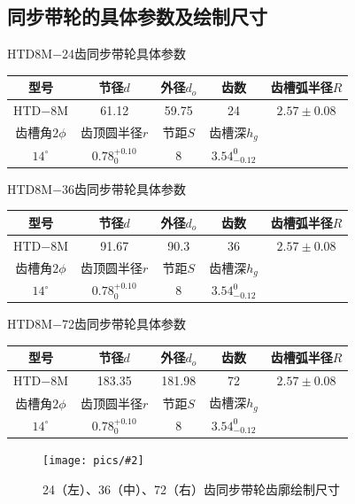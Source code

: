 \documentclass[UTF8]{article}%
\renewcommand{\arraystretch}{1.5}
\newcommand{\p}[4][0.5]{\begin{figure}[h]\centering\texttt{[image: pics/\#2]}\\\caption{#3}\label{#4}\end{figure}}%
\newcommand{\n}{\par}%
\begin{document}
\begin{spacing}{1.5}
	\subsection{同步带轮的具体参数及绘制尺寸}
	\begin{center}
		\renewcommand{\arraystretch}{0.6}
		HTD8M$-$24齿同步带轮具体参数\n
		\vspace*{0.2cm}
		\begin{tabular}{|c|c|c|c|c|}
			\hline 型号&节径$d$&外径$d_o$&齿数&齿槽弧半径$R$\\
			\hline HTD$-$8M&61.12&59.75&24&$2.57\pm0.08$\\
			\hline 齿槽角$2\phi$&齿顶圆半径$r$&节距$S$&齿槽深$h_g$&\\
			\hline $14^{\circ}$&$0.78_0^{+0.10}$&8&$3.54_{-0.12}^{0}$&\\\hline
		\end{tabular}
	\end{center}\n
	\begin{center}
		\renewcommand{\arraystretch}{0.6}
		HTD8M$-$36齿同步带轮具体参数\n
		\vspace*{0.2cm}
		\begin{tabular}{|c|c|c|c|c|}
			\hline 型号&节径$d$&外径$d_o$&齿数&齿槽弧半径$R$\\
			\hline HTD$-$8M&91.67&90.3&36&$2.57\pm0.08$\\
			\hline 齿槽角$2\phi$&齿顶圆半径$r$&节距$S$&齿槽深$h_g$&\\
			\hline $14^{\circ}$&$0.78_0^{+0.10}$&8&$3.54_{-0.12}^{0}$&\\\hline
		\end{tabular}
	\end{center}\n
	\begin{center}
		\renewcommand{\arraystretch}{0.6}
		HTD8M$-$72齿同步带轮具体参数\n
		\vspace*{0.2cm}
		\begin{tabular}{|c|c|c|c|c|}
			\hline 型号&节径$d$&外径$d_o$&齿数&齿槽弧半径$R$\\
			\hline HTD$-$8M&183.35&181.98&72&$2.57\pm0.08$\\
			\hline 齿槽角$2\phi$&齿顶圆半径$r$&节距$S$&齿槽深$h_g$&\\
			\hline $14^{\circ}$&$0.78_0^{+0.10}$&8&$3.54_{-0.12}^{0}$&\\\hline
		\end{tabular}
	\p[0.09]{24（左）、36（中）、72（右）齿同步带轮齿廓绘制尺寸.PDF}{24（左）、36（中）、72（右）齿同步带轮齿廓绘制尺寸}{dr24}
	\end{center}\n

\end{spacing}
\end{document}
